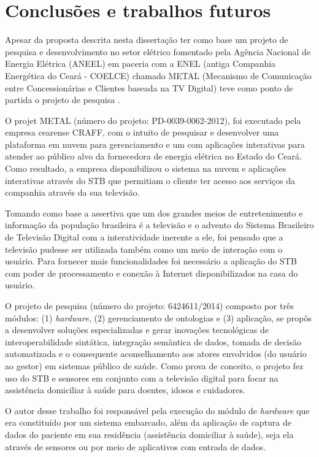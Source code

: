 \chapter{Conclusões e trabalhos futuros} \label{cap:conclusao}

Apesar da proposta descrita nesta dissertação ter como base um projeto de
pesquisa e desenvolvimento no setor elétrico fomentado pela Agência Nacional de
Energia Elétrica (ANEEL) em paceria com a ENEL (antiga Companhia Energética do
Ceará - COELCE) chamado METAL (Mecanismo de Comunicação entre Concessionárias e
Clientes baseada na TV Digital) teve como ponto de partida o projeto de pesquisa
\nextsaude.

O projet METAL (número do projeto: PD-0039-0062-2012), foi executado pela
empresa cearense CRAFF, com o intuito de pesquisar e desenvolver uma
plataforma em nuvem para gerenciamento e um \stb[] com aplicações interativas
para atender ao público alvo da fornecedora de energia elétrica no Estado do
Ceará. Como resultado, a empresa disponibilizou o sistema na nuvem e aplicações
interativas através do STB que permitiam o cliente ter acesso aos serviços da
companhia através da sua televisão.

Tomando como base a assertiva que um dos grandes meios de entretenimento e
informação da população brasileira é a televisão e o advento do Sistema
Brasileiro de Televisão Digital com a interatividade inerente a ele, foi
pensado que a televisão pudesse ser utilizada também como um meio de interação
com o usuário. Para fornecer mais funcionalidades foi necessário a aplicação do
STB com poder de processamento e conexão à Internet disponibilizados na casa do
usuário.   

O projeto de pesquisa \nextsaude[] (número do projeto: 6424611/2014) composto
por três módulos: (1) \textit{hardware}, (2) gerenciamento de ontologias e (3)
aplicação,  se propôs a desenvolver soluções especializadas e gerar inovações
tecnológicas de interoperabilidade sintática, integração semântica de dados,
tomada de decisão automatizada e o consequente aconselhamento aos atores
envolvidos (do usuário ao gestor) em sistemas público de saúde. Como prova de
conceito, o projeto fez uso do STB e sensores em conjunto com a televisão digital
para focar na  assistência domiciliar à saúde para doentes, idosos e cuidadores.

O autor desse trabalho foi responsável pela execução do módulo de
\textit{hardware} que era constituído por um sistema embarcado, além da aplicação de
captura de dados do paciente em sua residência (assistência domiciliar à
saúde), seja ela através de sensores ou por meio de aplicativos com entrada de
dados. 

